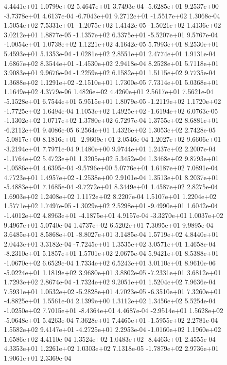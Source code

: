 4.4441e+01 1.0799e+02 5.4647e+01  3.7493e-04
-5.6285e+01  9.2537e+00 -3.7378e+01  4.6137e-04
-6.7043e+01  9.2712e+01 -1.5517e+02  1.3068e-04
 1.5054e+02  7.5331e+01 -1.2075e+02  1.4142e-05
-1.5021e+02  1.4136e+02  3.0212e+01  1.8877e-05
-1.1357e+02  6.3375e+01 -5.5207e+01  9.5767e-04
-1.0054e+01  1.0738e+02  1.1221e+02  4.1642e-05
5.7993e+01 8.2530e+01 5.4593e+01  5.1353e-04
-1.0281e+02  2.8551e+01  2.4774e+01  1.9131e-04
 1.6867e+02  8.3544e+01 -1.4530e+02  2.9418e-04
8.2528e+01 5.7118e+01 3.9083e+01  9.9676e-04
-1.2259e+02  6.1582e+01  1.5115e+02  9.7735e-04
 1.3688e+02  1.1291e+02 -2.1510e+01  1.7300e-05
7.7314e+01 5.0368e+01 1.1649e+02  4.3779e-06
1.4826e+02 4.4260e+01 2.5617e+01  7.5621e-04
-5.1528e+01  6.7544e+01  5.9515e+01  1.8079e-05
-1.2119e+02  1.1720e+02 -1.7725e+02  1.6494e-04
 1.1053e+02  1.4925e+02 -1.6194e+02  6.0763e-05
-1.1302e+02  1.0717e+02  1.3780e+02  6.7297e-04
 1.3755e+02  8.6881e+01 -6.2112e+01  9.4086e-05
6.2564e+01 1.4326e+02 1.3053e+02  2.7428e-05
-5.0817e+00  8.1816e+01 -2.9609e+01  2.0546e-04
 1.2027e+02  9.6606e+01 -3.2194e+01  7.7971e-04
9.1480e+00 9.9744e+01 1.2437e+02  2.2007e-04
-1.1764e+02  5.4723e+01  1.3205e+02  5.3452e-04
 1.3468e+02  9.8793e+01 -1.0586e+01  4.6395e-04
-9.5796e+00  5.0776e+01  1.6187e+02  7.0891e-04
 4.7723e+01  1.4957e+02 -1.2538e+00  2.9101e-04
 1.3513e+01  8.2037e+01 -5.4883e+01  7.1685e-04
-9.7272e+01  8.3449e+01  1.4587e+02  2.8275e-04
1.6903e+02 1.2408e+02 1.1172e+02  8.2207e-04
1.5107e+01 1.2204e+02 1.5771e+02  1.7497e-05
-1.3029e+02  2.5298e+01 -9.4990e+01  1.6042e-04
-1.4012e+02  4.8963e+01 -4.1875e+01  4.9157e-04
-3.3270e+01  1.0037e+02  9.4967e+01  5.0740e-04
1.4737e+02 6.5202e+01 7.3095e+01  9.9895e-04
 3.6485e+01  8.5868e+01 -8.8027e+01  3.1485e-04
1.5719e+02 4.8440e+01 2.0443e+01  3.3182e-04
-7.7245e+01  1.3535e+02  3.0571e+01  1.4658e-04
-8.2310e+01  5.1857e+01  1.5701e+02  2.0675e-04
 5.9421e+01  8.5388e+01 -1.0670e+02  6.6529e-04
1.7334e+02 6.5243e+01 3.0110e+01  8.9610e-06
-5.0224e+01  1.1819e+02  3.9680e+01  3.8802e-05
-7.2331e+01  3.6812e+01  1.7293e+02  2.8674e-04
-1.7324e+02  9.2051e+01  1.5204e+02  7.9636e-04
 7.5931e+01  1.0532e+02 -5.2828e+01  4.7023e-05
-6.3510e+01  7.3260e+01 -4.8825e+01  1.5561e-04
2.1399e+00 1.3112e+02 1.3456e+02  5.5254e-04
-1.0250e+02  7.7015e+01 -8.4364e+01  4.4687e-04
-2.9514e+01  1.5628e+02 -5.0648e+01  5.4263e-04
 7.3628e+01  7.4465e+01 -1.5955e+02  2.2781e-04
 1.5582e+02  9.4147e+01 -4.2725e+01  2.2953e-04
-1.0160e+02  1.1960e+02  1.6586e+02  4.4110e-04
 1.3524e+02  1.0483e+02 -8.4463e+01  2.4555e-04
4.3353e+01 1.2261e+02 1.0303e+02  7.1318e-05
-1.7879e+02  2.9736e+01  1.9061e+01  2.3369e-04
